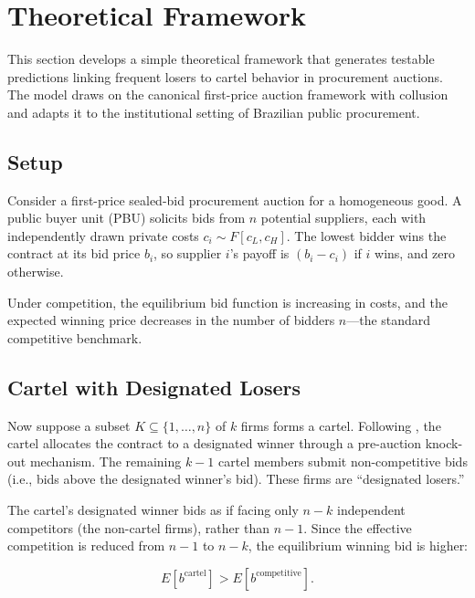 \section{Theoretical Framework}
\label{sec:theory}

This section develops a simple theoretical framework that generates testable predictions linking frequent losers to cartel behavior in procurement auctions. The model draws on the canonical first-price auction framework with collusion \citep{pesendorfer2000study, marshall2012economics} and adapts it to the institutional setting of Brazilian public procurement.

\subsection{Setup}

Consider a first-price sealed-bid procurement auction for a homogeneous good. A public buyer unit (PBU) solicits bids from $n$ potential suppliers, each with independently drawn private costs $c_i \sim F[c_L, c_H]$. The lowest bidder wins the contract at its bid price $b_i$, so supplier $i$'s payoff is $(b_i - c_i)$ if $i$ wins, and zero otherwise.

Under competition, the equilibrium bid function is increasing in costs, and the expected winning price decreases in the number of bidders $n$---the standard competitive benchmark.

\subsection{Cartel with Designated Losers}

Now suppose a subset $K \subseteq \{1, \ldots, n\}$ of $k$ firms forms a cartel. Following \citet{asker2010leniency}, the cartel allocates the contract to a designated winner through a pre-auction knock-out mechanism. The remaining $k - 1$ cartel members submit non-competitive bids (i.e., bids above the designated winner's bid). These firms are ``designated losers.''

The cartel's designated winner bids as if facing only $n - k$ independent competitors (the non-cartel firms), rather than $n - 1$. Since the effective competition is reduced from $n - 1$ to $n - k$, the equilibrium winning bid is higher:

\begin{equation}
  E[b^{\text{cartel}}] > E[b^{\text{competitive}}].
\end{equation}

